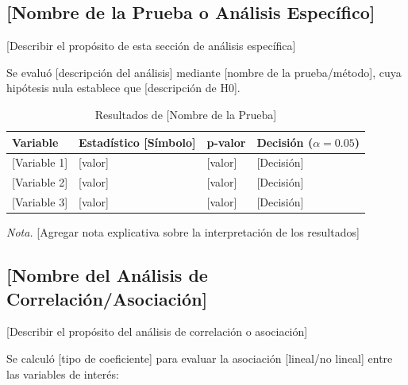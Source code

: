 \documentclass[12pt, letterpaper]{article}
\begin{document}
\subsection{[Nombre de la Prueba o Análisis Específico]}

[Describir el propósito de esta sección de análisis específica]

Se evaluó [descripción del análisis] mediante [nombre de la prueba/método], cuya hipótesis nula establece que [descripción de H0].

\begin{table}[H]
    \centering
    \caption{Resultados de [Nombre de la Prueba]}
    \begin{tabular}{@{}l>{\centering}p{2.5cm}>{\centering}p{2cm}>{\centering\arraybackslash}p{3cm}@{}}
        \toprule
        \textbf{Variable} & \textbf{Estadístico} \textbf{{[}Símbolo{]}} & \textbf{p-valor} & \textbf{Decisión} \textbf{($\alpha = 0.05$)} \\
        \midrule
        {[}Variable 1{]}  & {[}valor{]}                                 & {[}valor{]}      & {[}Decisión{]}                               \\
        {[}Variable 2{]}  & {[}valor{]}                                 & {[}valor{]}      & {[}Decisión{]}                               \\
        {[}Variable 3{]}  & {[}valor{]}                                 & {[}valor{]}      & {[}Decisión{]}                               \\
        \bottomrule
    \end{tabular}
    \label{tab:[etiqueta_tabla]}

    \vspace{0.2cm}
    \textit{Nota.} [Agregar nota explicativa sobre la interpretación de los resultados]
\end{table}

\subsection{[Nombre del Análisis de Correlación/Asociación]}

[Describir el propósito del análisis de correlación o asociación]

Se calculó [tipo de coeficiente] para evaluar la asociación [lineal/no lineal] entre las variables de interés:
\end{document}
